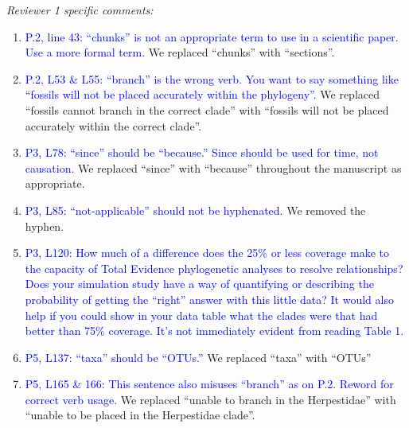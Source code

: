 \documentclass[12pt,letterpaper]{article}
\renewcommand{\subsection}[1]{%
\bigskip
\begin{center}
\begin{large}
\normalfont\itshape #1
\end{large}
\end{center}}
\begin{document}
\subsection{Reviewer 1 specific comments:}
\begin{enumerate}
\item{\textcolor{blue}{P.2, line 43: ``chunks'' is not an appropriate term to use in a scientific paper. Use a more formal term.}}
We replaced ``chunks'' with ``sections''.

\item{\textcolor{blue}{P.2, L53 \& L55: ``branch'' is the wrong verb. You want to say something like ``fossils will not be placed accurately within the phylogeny''.}}
We replaced ``fossils cannot branch in the correct clade'' with ``fossils will not be placed accurately within the correct clade''.

\item{\textcolor{blue}{P3, L78: ``since'' should be ``because.'' Since should be used for time, not causation.}}
We replaced ``since'' with ``because'' throughout the manuscript as appropriate.

\item{\textcolor{blue}{P3, L85: ``not-applicable'' should not be hyphenated.}}
We removed the hyphen.

\item{\textcolor{blue}{P3, L120: How much of a difference does the 25\% or less coverage make to the capacity of Total Evidence phylogenetic analyses to resolve relationships? Does your simulation study have a way of quantifying or describing the probability of getting the ``right'' answer with this little data? It would also help if you could show in your data table what the clades were that had better than 75\% coverage. It's not immediately evident from reading Table 1.}}


\item{\textcolor{blue}{P5, L137: ``taxa'' should be ``OTUs.''}}
We replaced ``taxa'' with ``OTUs''

\item{\textcolor{blue}{P5, L165 \& 166: This sentence also misuses ``branch'' as on P.2. Reword for correct verb usage.}}
We replaced ``unable to branch in the Herpestidae'' with ``unable to be placed in the Herpestidae clade''.


\end{enumerate}
\end{document}
